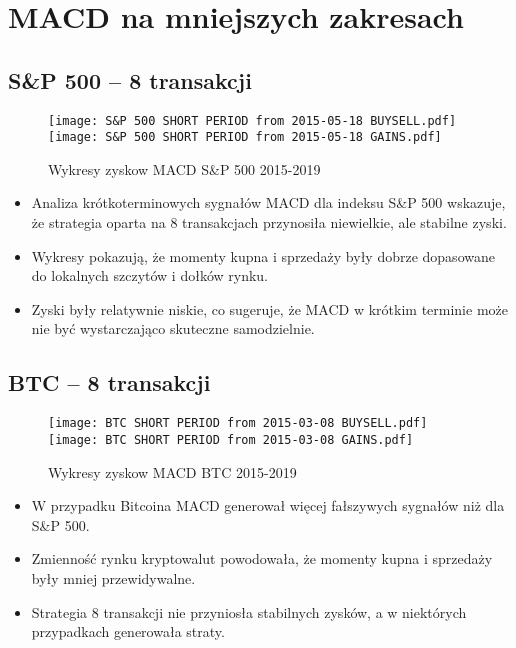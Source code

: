 \documentclass[12pt, letterpaper]{article}
\begin{document}
\section{MACD na mniejszych zakresach}
\subsection{S\&P 500 – 8 transakcji}
\begin{figure}[h!]
    \centering
    \texttt{[image: S\&P 500 SHORT PERIOD from 2015-05-18 BUYSELL.pdf]}
    \texttt{[image: S\&P 500 SHORT PERIOD from 2015-05-18 GAINS.pdf]}
    \caption{Wykresy zyskow MACD S\&P 500 2015-2019}
    \label{fig:BTC_2014_2017}
\end{figure}

\begin{itemize}
    \item Analiza krótkoterminowych sygnałów MACD dla indeksu S\&P 500 wskazuje, że strategia oparta na 8 transakcjach przynosiła niewielkie, ale stabilne zyski.
    \item Wykresy pokazują, że momenty kupna i sprzedaży były dobrze dopasowane do lokalnych szczytów i dołków rynku.
    \item Zyski były relatywnie niskie, co sugeruje, że MACD w krótkim terminie może nie być wystarczająco skuteczne samodzielnie.
\end{itemize}
    

\subsection{BTC – 8 transakcji}

\begin{figure}[h!]
    \centering
    \texttt{[image: BTC SHORT PERIOD from 2015-03-08 BUYSELL.pdf]}
    \texttt{[image: BTC SHORT PERIOD from 2015-03-08 GAINS.pdf]}
    \caption{Wykresy zyskow MACD  BTC 2015-2019}
    \label{fig:BTC_2014_2017}
\end{figure}

\begin{itemize}
    \item W przypadku Bitcoina MACD generował więcej fałszywych sygnałów niż dla S\&P 500.
    \item Zmienność rynku kryptowalut powodowała, że momenty kupna i sprzedaży były mniej przewidywalne.
    \item Strategia 8 transakcji nie przyniosła stabilnych zysków, a w niektórych przypadkach generowała straty.
\end{itemize}
\end{document}
